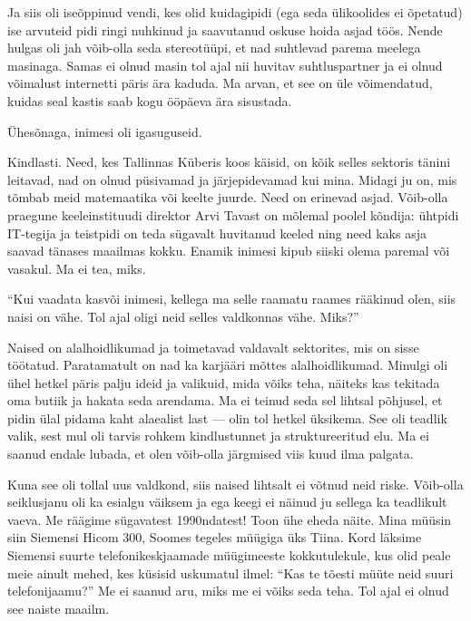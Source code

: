Ja siis oli iseõppinud vendi, kes olid kuidagipidi (ega seda ülikoolides ei õpetatud) 
ise arvuteid pidi ringi nuhkinud ja saavutanud oskuse hoida asjad töös. 
Nende hulgas oli jah võib-olla seda stereotüüpi, et nad
suhtlevad parema meelega masinaga. Samas ei olnud masin tol ajal nii huvitav 
suhtluspartner ja ei olnud võimalust internetti päris ära kaduda. Ma arvan, et see on üle võimendatud, 
kuidas seal kastis saab kogu ööpäeva ära sisustada. 

Ühesõnaga, inimesi oli igasuguseid.


Kindlasti. Need, kes Tallinnas 
Küberis koos käisid, on kõik selles sektoris tänini leitavad, nad on olnud
püsivamad ja järjepidevamad kui mina. Midagi ju on, mis tõmbab meid
matemaatika või keelte juurde. Need on erinevad 
asjad. Võib-olla praegune 
keeleinstituudi direktor Arvi Tavast on mõlemal poolel 
kõndija: ühtpidi IT-tegija ja teistpidi on teda sügavalt huvitanud 
keeled ning need kaks asja saavad tänases maailmas kokku. Enamik inimesi 
kipub siiski olema paremal või vasakul. Ma ei tea, miks.

\enquote{Kui vaadata kasvõi inimesi, kellega ma selle raamatu raames rääkinud olen, siis 
naisi on vähe. Tol ajal oligi neid selles valdkonnas vähe. Miks?}

Naised on alalhoidlikumad ja toimetavad valdavalt sektorites, mis on 
sisse töötatud. Paratamatult on nad ka karjääri mõttes 
alalhoidlikumad. Minulgi oli ühel hetkel päris 
palju ideid ja valikuid, mida võiks teha, näiteks kas tekitada oma butiik ja 
hakata seda arendama. Ma ei teinud seda sel lihtsal põhjusel, et pidin ülal pidama kaht alaealist last --- olin tol hetkel üksikema. See oli teadlik valik, sest mul oli tarvis rohkem kindlustunnet ja struktureeritud elu. Ma 
ei saanud endale lubada, et olen võib-olla järgmised viis kuud ilma palgata. 

Kuna see oli tollal uus valdkond, siis naised lihtsalt ei võtnud neid riske. Võib-olla 
seiklusjanu oli ka esialgu väiksem ja ega keegi ei näinud ju 
sellega ka teadlikult vaeva. Me räägime sügavatest 1990ndatest! Toon ühe
eheda näite. Mina müüsin siin Siemensi Hicom 300, Soomes tegeles müügiga üks Tiina. Kord läksime 
Siemensi suurte telefonikeskjaamade müügimeeste kokkutulekule, kus olid peale meie ainult 
mehed, kes küsisid uskumatul ilmel: 
\enquote{Kas te tõesti müüte neid suuri telefonijaamu?} Me ei saanud aru, miks 
me ei võiks seda teha. Tol ajal ei olnud see naiste maailm. 


